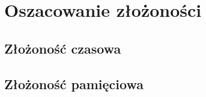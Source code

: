 \section{Oszacowanie złożoności}

\subsection*{Złożoność czasowa}


\subsection*{Złożoność pamięciowa}

